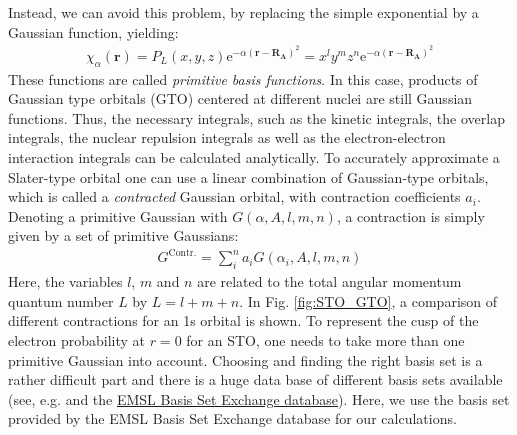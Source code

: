 \documentclass[twoside,        %
			   11pt,			%
               BCOR10mm,       %
               ngerman,english  %
               ]{scrartcl}
\begin{document}
Instead, we can avoid this problem, by replacing the simple exponential by a Gaussian function, yielding:
\begin{align*}
\chi_\alpha(\mathbf{r}) = P_L (x,y,z) \text{e}^{-\alpha (\mathbf{r-R_\text{A}})^2} = x^ly^mz^n \text{e}^{-\alpha (\mathbf{r-R_\text{A}})^2}
\end{align*} These functions are called \emph{primitive basis functions}. In this case, products of Gaussian type orbitals (GTO) centered at different nuclei are still Gaussian functions. Thus, the necessary integrals, such as the kinetic integrals, the overlap integrals, the nuclear repulsion integrals as well as the electron-electron interaction integrals can be calculated analytically.
To accurately approximate a Slater-type orbital one can use a linear combination of Gaussian-type orbitals, which is called a \emph{contracted} Gaussian orbital, with contraction coefficients $a_i$. Denoting a primitive Gaussian with $G(\alpha, A, l, m, n)$, a contraction is simply given by a set of primitive Gaussians:
\begin{align*}
G^\text{Contr.} = \sum\limits_i^n a_i G(\alpha_i, A, l, m, n)
\end{align*} 
Here, the variables $l$, $m$ and $n$ are related to the total angular momentum quantum number $L$ by $L = l+m+n$. In Fig. \ref{fig:STO_GTO}, a comparison of different contractions for an 1s orbital is shown. To represent the cusp of the electron probability at $r=0$ for an STO, one needs to take more than one primitive Gaussian into account. Choosing and finding the right basis set is a rather difficult part and there is a huge data base of different basis sets available (see, e.g. \cite{schuchardt2007basis, feller1996role} and the \href{https://bse.pnl.gov/}{EMSL Basis Set Exchange database}). Here, we use the basis set provided by the EMSL Basis Set Exchange database for our calculations.
\end{document}
